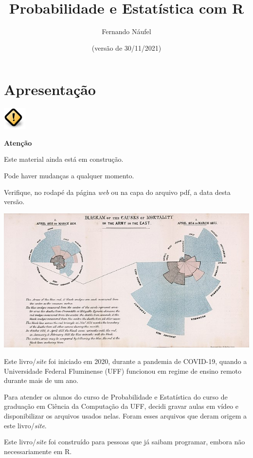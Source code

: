 \documentclass[
  11pt]{report}
\title{Probabilidade e Estatística com R}
\author{Fernando Náufel}
\date{(versão de 30/11/2021)}
\newenvironment{rmdcaution}
{
  \begin{mycaution}
    \includegraphics{images/caution.png}
    \tcblower
  }
  {
  \end{mycaution}
}
\begin{document}
\maketitle

{
\setcounter{tocdepth}{1}
\tableofcontents
}
\hypertarget{apresentacao}{%
\chapter*{Apresentação}\label{apresentacao}}

\begin{rmdcaution}
\textbf{Atenção}

Este material ainda está em construção.

Pode haver mudanças a qualquer momento.

Verifique, no rodapé da página \emph{web} ou na capa do arquivo pdf, a data desta versão.

\end{rmdcaution}

\newpage

\includegraphics{images/640px-Nightingale-mortality.jpg}

\vspace{2cm}

Este livro/\emph{site} foi iniciado em 2020, durante a pandemia de COVID-19, quando a Universidade Federal Fluminense (UFF) funcionou em regime de ensino remoto durante mais de um ano.

Para atender os alunos do curso de Probabilidade e Estatística do curso de graduação em Ciência da Computação da UFF, decidi gravar aulas em vídeo e disponibilizar os arquivos usados nelas. Foram esses arquivos que deram origem a este livro/\emph{site}.

Este livro/\emph{site} foi construído para pessoas que já saibam programar, embora não necessariamente em R.
\end{document}
